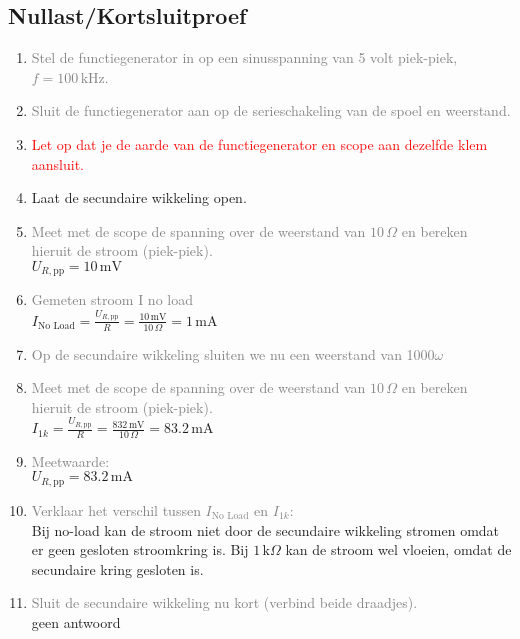 \subsection{Nullast/Kortsluitproef}
\begin{enumerate}
    \item \textcolor{gray}{Stel de functiegenerator in op een sinusspanning van 5 volt piek-piek, \( f = 100 \, \text{kHz} \).}
    \item \textcolor{gray}{Sluit de functiegenerator aan op de serieschakeling van de spoel en weerstand.}
    \item \textcolor{red}{Let op dat je de aarde van de functiegenerator en scope aan dezelfde klem aansluit.}
    \item Laat de secundaire wikkeling open.
    \item \textcolor{gray}{Meet met de scope de spanning over de weerstand van \(10 \, \Omega\) en bereken hieruit de stroom (piek-piek).}
    \\ \( U_{R,\text{pp}} = 10 \, \text{mV} \)
    
    \item \textcolor{gray}{Gemeten stroom I no load}
    \\ \(I_{\text{No Load}} = \frac{U_{R,\text{pp}}}{R} = \frac{10 \, \text{mV}}{10 \, \Omega} = 1 \, \text{mA}\)
    
    \item \textcolor{gray}{Op de secundaire wikkeling sluiten we nu een weerstand van 1000\(\omega\)}
    \item \textcolor{gray}{Meet met de scope de spanning over de weerstand van \(10 \, \Omega\) en bereken hieruit de stroom (piek-piek).}
    \\ \(I_{1k} = \frac{U_{R,\text{pp}}}{R} = \frac{832 \, \text{mV}}{10 \, \Omega} = 83.2 \, \text{mA}\)
    
    \item \textcolor{gray}{Meetwaarde:}
    \\ \( U_{R,\text{pp}} = 83.2 \, \text{mA} \)
    
    \item \textcolor{gray}{Verklaar het verschil tussen \( I_{\text{No Load}} \) en \( I_{1k} \): }
    \\ Bij no-load kan de stroom niet door de secundaire wikkeling stromen omdat er geen gesloten stroomkring is. Bij \(1 \, \text{k} \Omega\) kan de stroom wel vloeien, omdat de secundaire kring gesloten is.

    \item \textcolor{gray}{Sluit de secundaire wikkeling nu kort (verbind beide draadjes).}
    \\ geen antwoord
    

\end{enumerate}
